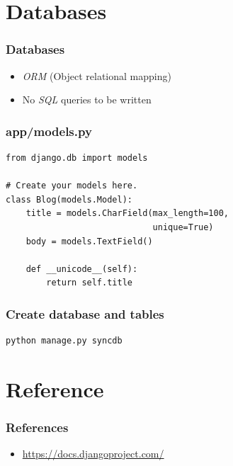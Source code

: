 \documentclass[bigger, presentation]{beamer}
\begin{document}
\section{Databases}
\label{sec-5}
\begin{frame}
\frametitle{Databases}
\label{sec-5-1}

\begin{itemize}
\item \emph{ORM} (Object relational mapping)
\item No \emph{SQL} queries to be written
\end{itemize}
\end{frame}
\begin{frame}[fragile]
\frametitle{app/models.py}
\label{sec-5-2}



\begin{verbatim}
from django.db import models

# Create your models here.
class Blog(models.Model):
    title = models.CharField(max_length=100,
                             unique=True)
    body = models.TextField()

    def __unicode__(self):
        return self.title
\end{verbatim}
\end{frame}
\begin{frame}[fragile]
\frametitle{Create database and tables}
\label{sec-5-3}

     

\begin{verbatim}
python manage.py syncdb
\end{verbatim}
\end{frame}
\section{Reference}
\label{sec-6}
\begin{frame}
\frametitle{References}
\label{sec-6-1}

\begin{itemize}
\item \href{https://docs.djangoproject.com/}{https://docs.djangoproject.com/}
\end{itemize}
\end{frame}
\end{document}
